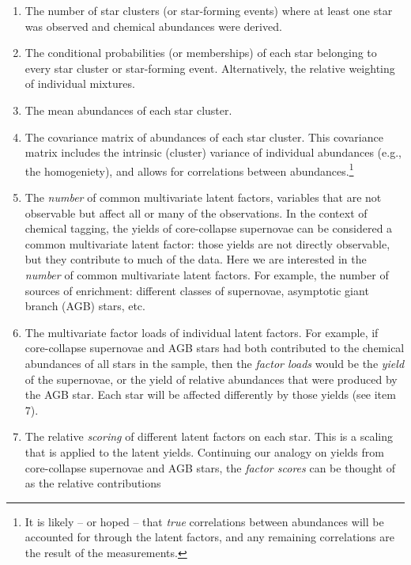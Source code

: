 \documentclass{aastex61}
\begin{document}
\begin{enumerate}
  \item The number of star clusters (or star-forming events) where at least 
        one star was observed and chemical abundances were derived.
  \item The conditional probabilities (or memberships) of each star belonging
        to every star cluster or star-forming event.
        Alternatively, the relative weighting of individual mixtures.
  \item The mean abundances of each star cluster. 
  \item The covariance matrix of abundances of each star cluster.
        This covariance matrix includes the intrinsic (cluster) variance
        of individual abundances (e.g., the homogeniety), and allows for
        correlations between abundances.\footnote{
          It is likely -- or hoped -- that \emph{true} correlations between 
          abundances will be accounted for through the latent factors, and any 
          remaining correlations are the result of the measurements.}
  \item The \emph{number} of common multivariate latent factors, variables 
        that are not observable but affect all or many of the observations.
        In the context of chemical tagging, the yields of core-collapse
        supernovae can be considered a common multivariate latent factor: 
        those yields are not directly observable, but they contribute to much 
        of the data.
        Here we are interested in the \emph{number} of common multivariate
        latent factors. For example, the number of sources of enrichment:
        different classes of supernovae, asymptotic giant branch (AGB) stars, 
        etc.
  \item The multivariate factor loads of individual latent factors. 
        For example, if core-collapse supernovae and AGB stars had both 
        contributed to the chemical abundances of all stars in the sample, 
        then the \emph{factor loads} would be the \emph{yield} of the 
        supernovae, or the yield of relative abundances that were produced by 
        the AGB star. 
        Each star will be affected differently by those yields (see item 7).
  \item The relative \emph{scoring} of different latent factors on each star.
        This is a scaling that is applied to the latent yields. Continuing our
        analogy on yields from core-collapse supernovae and AGB stars, the
        \emph{factor scores} can be thought of as the relative contributions 

\end{enumerate}
\end{document}
